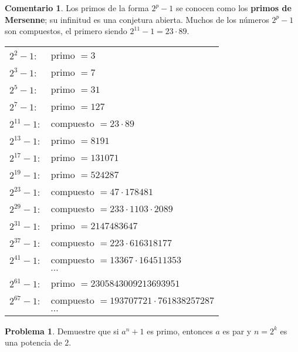 \documentclass{article}
\theoremstyle{definition}
\newtheorem{problema}{Problema}
\newtheorem*{comentario}{Comentario}
\newenvironment{solucion}{\begin{proof}[Solución]}{\end{proof}}
\begin{document}
\begin{comentario}
  Los primos de la forma $2^p - 1$ se conocen como los
  \textbf{primos de Mersenne}; su infinitud es una conjetura abierta. Muchos de
  los números $2^p - 1$ son compuestos, el primero siendo
  $2^{11} - 1 = 23\cdot 89$.

  \begin{center}
    \begin{tabular}{ll}
      $2^2 - 1\colon$ & primo $= 3$ \\
      $2^3 - 1\colon$ & primo $= 7$ \\
      $2^5 - 1\colon$ & primo $= 31$ \\
      $2^7 - 1\colon$ & primo $= 127$ \\
      $2^{11} - 1\colon$ & compuesto $= 23\cdot 89$ \\
      $2^{13} - 1\colon$ & primo $= 8191$ \\
      $2^{17} - 1\colon$ & primo $= 131071$ \\
      $2^{19} - 1\colon$ & primo $= 524287$ \\
      $2^{23} - 1\colon$ & compuesto $= 47\cdot 178481$ \\
      $2^{29} - 1\colon$ & compuesto $= 233\cdot 1103\cdot 2089$ \\
      $2^{31} - 1\colon$ & primo $= 2147483647$ \\
      $2^{37} - 1\colon$ & compuesto $= 223\cdot 616318177$ \\
      $2^{41} - 1\colon$ & compuesto $= 13367\cdot 164511353$ \\
                      & $\cdots$ \\
      $2^{61} - 1\colon$ & primo $= 2305843009213693951$ \\
      $2^{67} - 1\colon$ & compuesto $= 193707721\cdot 761838257287$ \\
                      & $\cdots$
    \end{tabular}
  \end{center}
\end{comentario}

\begin{problema}
  Demuestre que si $a^n + 1$ es primo, entonces $a$ es par y $n = 2^k$ es
  una potencia de $2$.

\end{problema}
\end{document}
